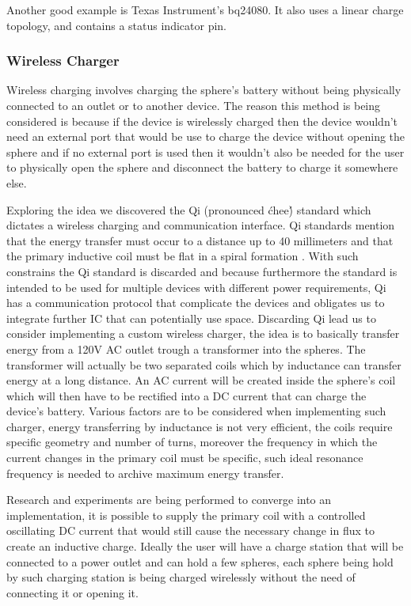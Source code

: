 Another good example is Texas Instrument's bq24080. It also uses a linear charge topology, and contains a status indicator pin.
\subsubsection{Wireless Charger}
Wireless charging involves charging the sphere's battery without being physically connected to an outlet or to another device. The reason this method is being considered is because if the device is wirelessly charged then the device wouldn't need an external port that would be use to charge the device without opening the sphere and if no external port is used then it wouldn't also be needed for the user to physically open the sphere and disconnect the battery to charge it somewhere else. 

Exploring the idea we discovered the Qi (pronounced \'chee\') standard which dictates a wireless charging and communication interface. Qi standards mention that the energy transfer must occur to a distance up to 40 millimeters and that the primary inductive coil must be flat in a spiral formation \cite{QiStandard}. With such constrains the Qi standard is discarded and because furthermore the standard is intended to be used for multiple devices with different power requirements, Qi has a communication protocol that complicate the devices and obligates us to integrate further IC that can potentially use space. Discarding Qi lead us to consider implementing a custom wireless charger, the idea is to basically transfer energy from a 120V AC outlet trough a transformer into the spheres. The transformer will actually be two separated coils which by inductance can transfer energy at a long distance. An AC current will be created inside the sphere's coil which will then have to be rectified into a DC current that can charge the device's battery. Various factors are to be considered when implementing such charger, energy transferring by inductance is not very efficient, the coils require specific geometry and number of turns, moreover the frequency in which the current changes in the primary coil must be specific, such ideal resonance frequency is needed to archive maximum energy transfer. 

Research and experiments are being performed to converge into an implementation, it is possible to supply the primary coil with a controlled oscillating DC current that would still cause the necessary change in flux to create an inductive charge. Ideally the user will have a charge station that will be connected to a power outlet and can hold a few spheres, each sphere being hold by such charging station is being charged wirelessly without the need of connecting it or opening it. 
